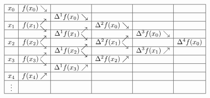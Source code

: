 \documentclass[11pt,a4paper,notitlepage,fleqn]{article}
\begin{document}
 	\[
 		\begin{array}{|c|c|c|c|c|c|}
 			\hline
 			 x_0   & f(x_0) \searrow &                 &                 &                 &  \\ \hline
 			       &        & \Delta^1 f(x_0) \searrow &                 &                 &  \\ \hline
 			 x_1   & f(x_1) \nesearrow &                 & \Delta^2 f(x_0) \searrow &                 &  \\ \hline
 			       &        & \Delta^1 f(x_1) \nesearrow &                 & \Delta^3 f(x_0) \searrow &  \\ \hline
 			 x_2   & f(x_2) \nesearrow &                 & \Delta^2 f(x_1) \nesearrow &                 & \Delta^4 f(x_0) \\ \hline
 			       &        & \Delta^1 f(x_2) \nesearrow &                 & \Delta^3 f(x_1) \nearrow &  \\ \hline
 			 x_3   & f(x_3) \nesearrow &                 & \Delta^2 f(x_2) \nearrow &                 &  \\ \hline
 			       &        & \Delta^1 f(x_3) \nearrow &                 &                 &  \\ \hline
 			 x_4   & f(x_4) \nearrow &                 &                 &                 &  \\ \hline
 			\vdots &        &                 &                 &                 &  \\ \hline
 		\end{array}
 	\]
 	
\end{document}
